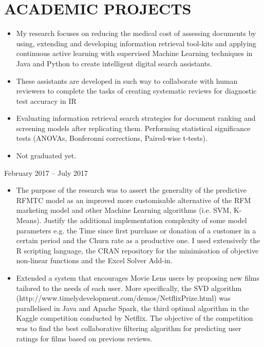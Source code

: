 \section{ACADEMIC PROJECTS}
{
  {\begin{itemize}
    \item My research focuses on reducing the medical cost of assessing documents by using, extending and developing information retrieval tool-kits and applying continuous active learning with supervised Machine Learning techniques in Java and Python to create intelligent digital search assistants.
    \item These assistants are developed in such way to collaborate with human reviewers to complete the tasks of creating systematic reviews for diagnostic test accuracy in IR
    \item Evaluating information retrieval search strategies for document ranking and screening models after replicating them. Performing statistical significance tests (ANOVAs, Bonferonni corrections, Paired-wise t-tests).
    \item Not graduated yet.
  \end{itemize}
  }
}

{ {February 2017 – July 2017}
{\begin{itemize}
  \item The purpose of the research was to assert the generality of the predictive RFMTC model as an improved more customisable alternative of the RFM marketing model and other Machine Learning algorithms (i.e. SVM, K-Means). Justify the additional implementation complexity of some model parameters e.g. the Time since first purchase or donation of a customer in a certain period and the Churn rate as a productive one. I used extensively the R scripting language, the CRAN repository for the minimisation of objective non-linear functions and the Excel Solver Add-in.
\end{itemize}
}
}


{
{\begin{itemize}
  \item Extended a system that encourages Movie Lens users by proposing new films tailored to the needs of each user. More specifically, the SVD algorithm (http://www.timelydevelopment.com/demos/NetflixPrize.html) was parallelised in Java and Apache Spark, the third optimal algorithm in the Kaggle competition conducted by Netflix. The objective of the competition was to find the best collaborative filtering algorithm for predicting user ratings for films based on previous reviews.
\end{itemize}
}
}